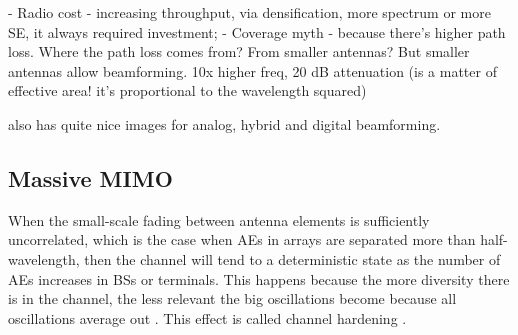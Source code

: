 - Radio cost - increasing throughput, via densification, more spectrum or more SE, it always required investment;
- Coverage myth - because there's higher path loss. Where the path loss comes from? From smaller antennas? But smaller antennas allow beamforming. 10x higher freq, 20 dB attenuation (is a matter of effective area! it's proportional to the wavelength squared)

\cite{phdthesis}


\cite{phdthesis} also has quite nice images for analog, hybrid and digital beamforming.



\subsection{Massive MIMO}




When the small-scale fading between antenna elements is sufficiently uncorrelated, which is the case when AEs in arrays are separated more than half-wavelength, then the channel will tend to a deterministic state as the number of AEs increases in BSs or terminals. This happens because the more diversity there is in the channel, the less relevant the big oscillations become because all oscillations average out . This effect is called channel hardening \cite{1327795}.







